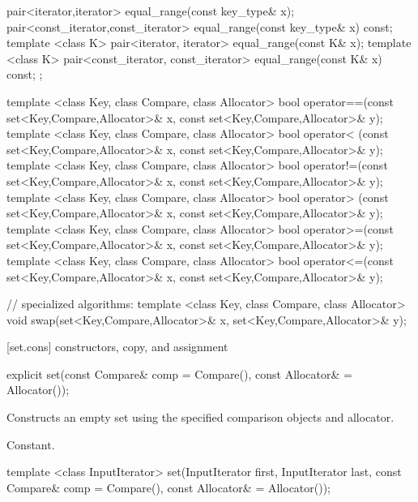 \begin{codeblock}
{{    pair<iterator,iterator>             equal_range(const key_type& x);
    pair<const_iterator,const_iterator> equal_range(const key_type& x) const;
    template <class K>
      pair<iterator, iterator>             equal_range(const K& x);
    template <class K>
      pair<const_iterator, const_iterator> equal_range(const K& x) const;
  };

  template <class Key, class Compare, class Allocator>
    bool operator==(const set<Key,Compare,Allocator>& x,
                    const set<Key,Compare,Allocator>& y);
  template <class Key, class Compare, class Allocator>
    bool operator< (const set<Key,Compare,Allocator>& x,
                    const set<Key,Compare,Allocator>& y);
  template <class Key, class Compare, class Allocator>
    bool operator!=(const set<Key,Compare,Allocator>& x,
                    const set<Key,Compare,Allocator>& y);
  template <class Key, class Compare, class Allocator>
    bool operator> (const set<Key,Compare,Allocator>& x,
                    const set<Key,Compare,Allocator>& y);
  template <class Key, class Compare, class Allocator>
    bool operator>=(const set<Key,Compare,Allocator>& x,
                    const set<Key,Compare,Allocator>& y);
  template <class Key, class Compare, class Allocator>
    bool operator<=(const set<Key,Compare,Allocator>& x,
                    const set<Key,Compare,Allocator>& y);

  // specialized algorithms:
  template <class Key, class Compare, class Allocator>
    void swap(set<Key,Compare,Allocator>& x,
              set<Key,Compare,Allocator>& y);
}
\end{codeblock}%
%

[set.cons]{ constructors, copy, and assignment}

%
%
\begin{itemdecl}
explicit set(const Compare& comp = Compare(),
             const Allocator& = Allocator());
\end{itemdecl}

\begin{itemdescr}
\pnum
\effects
Constructs an empty set using the specified comparison objects and allocator.

\pnum
\complexity
Constant.
\end{itemdescr}

%
%
\begin{itemdecl}
template <class InputIterator>
  set(InputIterator first, InputIterator last,
      const Compare& comp = Compare(), const Allocator& = Allocator());
\end{itemdecl}

